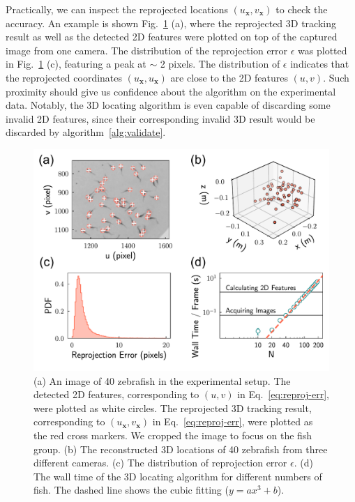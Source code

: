 \documentclass[11pt,twoside]{report}
\begin{document}
Practically, we can inspect the reprojected locations $(u_\mathbf{x}, v_\mathbf{x})$ to check the accuracy.
An example is shown Fig.~\ref{fig:locate-performance} (a), where the reprojected 3D tracking result as well as the detected 2D features were plotted on top of the captured image from one camera.
The distribution of the reprojection error $\epsilon$ was plotted in Fig.~\ref{fig:locate-performance} (c), featuring a peak at $\sim$ 2 pixels.
The distribution of $\epsilon$ indicates that the reprojected coordinates $(u_\mathbf{x}, u_\mathbf{x})$ are close to the 2D features $(u, v)$.
Such proximity should give us confidence about the algorithm on the experimental data. Notably, the 3D locating algorithm is even capable of discarding some invalid 2D features, since their corresponding invalid 3D result would be discarded by algorithm~\ref{alg:validate}.


\begin{figure}
  \includegraphics[width=\linewidth]{locate-perform}
  \caption[Performance of the 3D locating method]{
  (a) An image of 40 zebrafish in the experimental setup.  The detected 2D features, corresponding to $(u, v)$ in Eq.~\ref{eq:reproj-err}, were plotted as white circles. The reprojected 3D tracking result, corresponding to $(u_\mathbf{x}, v_\mathbf{x})$ in Eq.~\ref{eq:reproj-err}, were plotted as the red cross markers. We cropped the image to focus on the fish group. 
  (b) The reconstructed 3D locations of 40 zebrafish from three different cameras.
  (c) The distribution of reprojection error $\epsilon$.
  (d) The wall time of the 3D locating algorithm for different numbers of fish. The dashed line shows the cubic fitting ($y = a x^3 + b$).
  }
\label{fig:locate-performance}
\end{figure}
\end{document}
